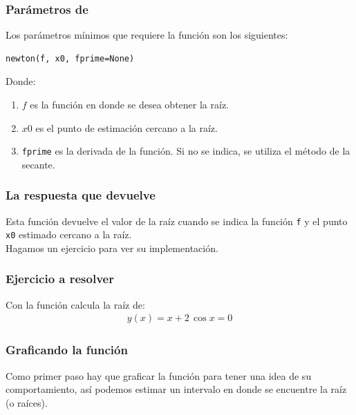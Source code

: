\documentclass[12pt]{beamer}
\begin{document}
\begin{frame}[fragile]
\frametitle{Parámetros de }
Los parámetros mínimos que requiere la función son los siguientes:
\pause
\begin{verbatim}
newton(f, x0, fprime=None)
\end{verbatim}
\pause
Donde:
\begin{enumerate}[<+->]
\item $f$ es la función en donde se desea obtener la raíz.
\item $x0$ es el punto de estimación cercano a la raíz.
\item \texttt{fprime} es la derivada de la función. Si no se indica, se utiliza el método de la secante.
\end{enumerate}
\end{frame}
\begin{frame}
\frametitle{La respuesta que devuelve}
Esta función  devuelve el valor de la raíz cuando se indica la función \texttt{f} y el punto \texttt{x0} estimado cercano a la raíz.
\\
\bigskip
\pause
Hagamos un ejercicio para ver su implementación.
\end{frame}
\begin{frame}
\frametitle{Ejercicio a resolver}
Con la función  calcula la raíz de:
\begin{align*}
y (x) = x + 2 \, \cos x = 0
\end{align*}
\end{frame}
\begin{frame}
\frametitle{Graficando la función}
Como primer paso hay que graficar la función para tener una idea de su comportamiento, así podemos estimar un intervalo en donde se encuentre la raíz (o raíces).
\end{frame}
\end{document}
